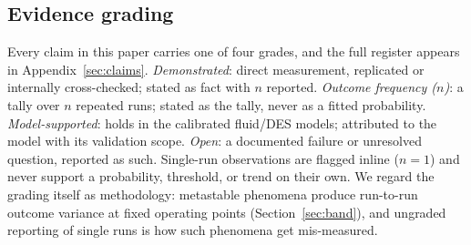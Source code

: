 \subsection{Evidence grading}
\label{sec:grading}

Every claim in this paper carries one of four grades, and the full
register appears in Appendix~\ref{sec:claims}. \emph{Demonstrated}: direct measurement,
replicated or internally cross-checked; stated as fact with $n$
reported. \emph{Outcome frequency ($n$)}: a tally over $n$ repeated runs;
stated as the tally, never as a fitted probability. \emph{Model-supported}:
holds in the calibrated fluid/DES models; attributed to the model
with its validation scope. \emph{Open}: a documented failure or unresolved
question, reported as such. Single-run observations are flagged
inline ($n=1$) and never support a probability, threshold, or trend on
their own. We regard the grading itself as methodology: metastable
phenomena produce run-to-run outcome variance at fixed operating
points (Section~\ref{sec:band}), and ungraded reporting of single runs is how
such phenomena get mis-measured.
